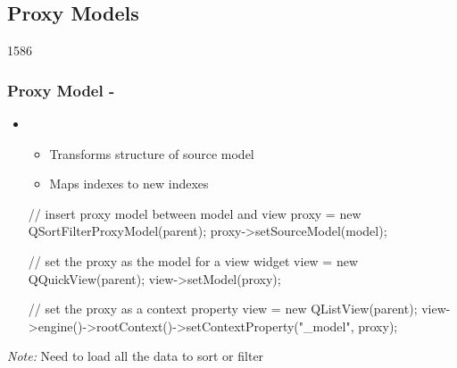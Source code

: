 %
%
%
%

\subsection{Proxy Models}
\begin{slide}[fragile]{1586}\frametitle{Proxy Model - }
  \begin{itemize}
  \item {}
    \begin{itemize}
    \item Transforms structure of source model
    \item Maps indexes to new indexes
    \end{itemize}
\begin{cpp}
// insert proxy model between model and view
proxy = new QSortFilterProxyModel(parent);
proxy->setSourceModel(model);
\end{cpp}
\medskip
\begin{cpp}
// set the proxy as the model for a view widget
view = new QQuickView(parent);
view->setModel(proxy);
\end{cpp}
\medskip
\begin{cpp}
// set the proxy as a context property
view = new QListView(parent);
view->engine()->rootContext()->setContextProperty("_model", proxy);
\end{cpp}
  \end{itemize}
\textit{Note:} Need to load all the data to sort or filter
\end{slide}
